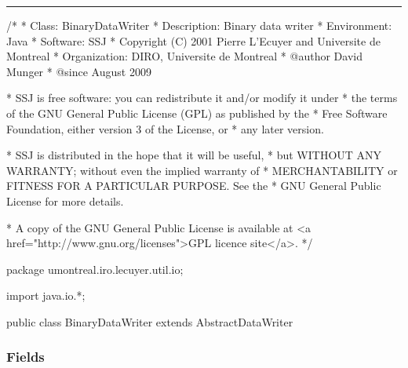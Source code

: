 \bigskip\hrule

\begin{code}
\begin{hide}
/*
 * Class:        BinaryDataWriter
 * Description:  Binary data writer
 * Environment:  Java
 * Software:     SSJ 
 * Copyright (C) 2001  Pierre L'Ecuyer and Universite de Montreal
 * Organization: DIRO, Universite de Montreal
 * @author       David Munger 
 * @since        August 2009

 * SSJ is free software: you can redistribute it and/or modify it under
 * the terms of the GNU General Public License (GPL) as published by the
 * Free Software Foundation, either version 3 of the License, or
 * any later version.

 * SSJ is distributed in the hope that it will be useful,
 * but WITHOUT ANY WARRANTY; without even the implied warranty of
 * MERCHANTABILITY or FITNESS FOR A PARTICULAR PURPOSE.  See the
 * GNU General Public License for more details.

 * A copy of the GNU General Public License is available at
   <a href="http://www.gnu.org/licenses">GPL licence site</a>.
 */
\end{hide}
package umontreal.iro.lecuyer.util.io;
\begin{hide}
import java.io.*;
\end{hide}

public class BinaryDataWriter extends AbstractDataWriter \begin{hide} {
   protected DataOutputStream out;
   
   /**
    * Utility method to write string data.
    *
    */    
   protected void writeStringData(String s) throws IOException {
      if (s != null) {
         out.writeInt(s.length());
         out.writeBytes(s);
      }
      else {
         out.writeInt(0);
      }
   }
   
   /**
    * Starts a new field by writing its label.
    *
    * @param label   name of the field (can be {@code null})
    *
    */
   protected void writeLabel(String label) throws IOException {
      out.writeByte(TYPECHAR_LABEL);
      writeStringData(label);
   }
\end{hide}
\end{code}

\subsubsection*{Fields}

